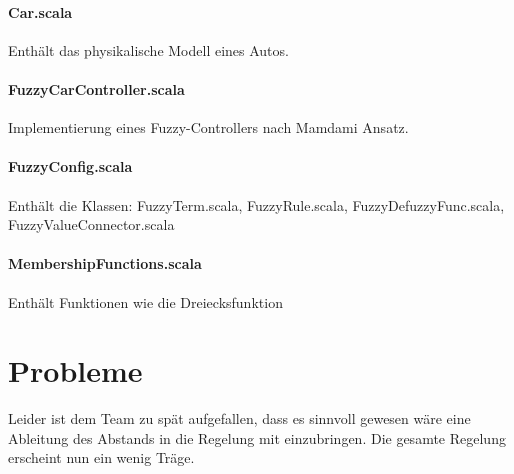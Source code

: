 \documentclass[12pt,a4paper,bibliography=totocnumbered,listof=totocnumbered, abstracton]{scrartcl}
\theoremstyle{Umgebung}
\begin{document}
\paragraph{Car.scala}

Enthält das physikalische Modell eines Autos.

\paragraph{FuzzyCarController.scala}

Implementierung eines Fuzzy-Controllers nach Mamdami Ansatz.

\paragraph{FuzzyConfig.scala}

Enthält die Klassen: FuzzyTerm.scala, FuzzyRule.scala, FuzzyDefuzzyFunc.scala, FuzzyValueConnector.scala

\paragraph{MembershipFunctions.scala}

Enthält Funktionen wie die Dreiecksfunktion

\section{Probleme}

Leider ist dem Team zu spät aufgefallen, dass es sinnvoll gewesen wäre eine Ableitung des Abstands in die Regelung mit einzubringen. Die gesamte Regelung erscheint nun ein wenig Träge.

\end{document}
